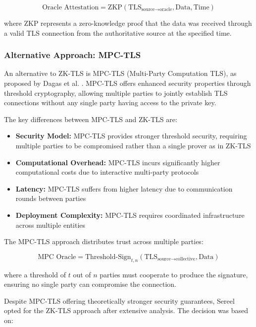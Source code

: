 \documentclass[12pt]{article}
\begin{document}
\begin{equation}
\text{Oracle Attestation} = \text{ZKP}(\text{TLS}_{\text{source} \rightarrow \text{oracle}}, \text{Data}, \text{Time})
\end{equation}

where ZKP represents a zero-knowledge proof that the data was received through a valid TLS connection from the authoritative source at the specified time.

\subsubsection{Alternative Approach: MPC-TLS}

An alternative to ZK-TLS is MPC-TLS (Multi-Party Computation TLS), as proposed by Dagas et al. \cite{dagas2024mpctls}. MPC-TLS offers enhanced security properties through threshold cryptography, allowing multiple parties to jointly establish TLS connections without any single party having access to the private key.

The key differences between MPC-TLS and ZK-TLS are:

\begin{itemize}
  \item \textbf{Security Model:} MPC-TLS provides stronger threshold security, requiring multiple parties to be compromised rather than a single prover as in ZK-TLS
  \item \textbf{Computational Overhead:} MPC-TLS incurs significantly higher computational costs due to interactive multi-party protocols
  \item \textbf{Latency:} MPC-TLS suffers from higher latency due to communication rounds between parties
  \item \textbf{Deployment Complexity:} MPC-TLS requires coordinated infrastructure across multiple entities
\end{itemize}

The MPC-TLS approach distributes trust across multiple parties:

\begin{equation}
\text{MPC Oracle} = \text{Threshold-Sign}_{t,n}(\text{TLS}_{\text{source} \rightarrow \text{collective}}, \text{Data})
\end{equation}

where a threshold of $t$ out of $n$ parties must cooperate to produce the signature, ensuring no single party can compromise the connection.

Despite MPC-TLS offering theoretically stronger security guarantees, Sereel opted for the ZK-TLS approach after extensive analysis. The decision was based on:
\end{document}

